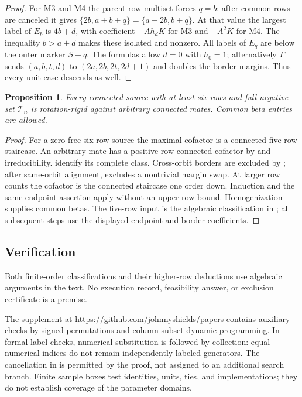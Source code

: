 \documentclass[11pt,a4paper]{amsart}
\numberwithin{equation}{section}
\theoremstyle{plain}
\newtheorem{proposition}[theorem]{Proposition}
\theoremstyle{definition}
\begin{document}
\begin{proof}
For M3 and M4 the parent row multiset forces \(q=b\): after common
rows are canceled it gives
\(\{2b,a+b+q\}=\{a+2b,b+q\}\).
At that value the largest label of \(E_b\) is \(4b+d\), with coefficient
\(-Ah_dK\) for M3 and \(-A^2K\) for M4.  The inequality \(b>a+d\)
makes these isolated and nonzero.  All labels of \(E_q\) are below the
outer marker \(S+q\).
The formulas allow \(d=0\) with \(h_0=1\); alternatively \(\Gamma\)
sends \((a,b,t,d)\) to \((2a,2b,2t,2d+1)\) and doubles the border
margins.  Thus every unit case descends as well.
\end{proof}

\begin{proposition}\label{prop:staircase-higher-rows}
Every connected source with at least six rows and full negative set
\(\mathcal T_n\) is rotation-rigid against arbitrary connected mates.
Common beta entries are allowed.
\end{proposition}

\begin{proof}
For a zero-free six-row
source the maximal cofactor is a connected five-row staircase.
An arbitrary mate has a positive-row connected cofactor by
 and irreducibility.
 identify its complete
class.  Cross-orbit borders are excluded by
; after same-orbit alignment,
 excludes a nontrivial margin swap.
At larger row counts the cofactor is the connected staircase one order
down.  Induction and the same endpoint assertion apply without an upper
row bound.  Homogenization supplies common betas.  The five-row input is
the algebraic classification in ;
all subsequent steps use the displayed endpoint and border coefficients.
\end{proof}

\subsection{Verification}\label{sec:certificates}

Both finite-order classifications and their higher-row deductions use
algebraic arguments in the text.  No execution record, feasibility
answer, or exclusion certificate is a premise.

The supplement at \url{https://github.com/johnnyshields/papers} contains
auxiliary checks by signed permutations and column-subset dynamic
programming.  In formal-label checks, numerical substitution is followed
by collection: equal numerical indices do not remain independently
labeled generators.  The cancellation in  is
permitted by the proof, not assigned to an additional search branch.
Finite sample boxes test identities, units, ties, and implementations;
they do not establish coverage of the parameter domains.
\end{document}
